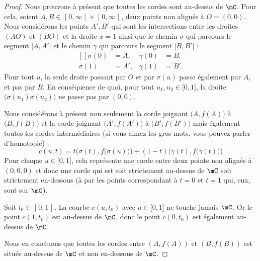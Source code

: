 \begin{proof}
	Nous prouvons à présent que toutes les cordes sont au-dessus de \( \mC\). Pour cela, soient \( A,B\in \mathopen] 0 , \infty \mathclose[\times \mathopen] 0 , \infty \mathclose[\), deux points non alignés à \( O=(0,0)\). Nous considérons les points \( A',B'\) qui sont les intersections entre les droites \( (AO)\) et \( (BO)\) et la droite \( x=1\) ainsi que le chemin \( \sigma\) qui parcours le segment \( \mathopen[ A , A' \mathclose]\) et le chemin \( \gamma\) qui parcours le segment \( \mathopen[ B , B' \mathclose]\) :
		\begin{equation}
			\begin{aligned}[]
				\sigma(0) & =A,  & \gamma(0) & =B,  \\
				\sigma(1) & =A', & \gamma(1) & =B'.
			\end{aligned}
		\end{equation}
		Pour tout \( u\), la seule droite passant par \( O\) et par \( \sigma(u)\) passe également par \( A\), et pas par \( B\). En conséquence de quoi, pour tout \( u_1,u_2\in \mathopen[ 0 , 1 \mathclose]\), la droite \( \big( \sigma(u_1)\sigma(u_2) \big)\) ne passe pas par \( (0,0)\).

		Nous considérons à présent non seulement la corde joignant \( \big( A,f(A) \big)\) à \( \big( B,f(B) \big)\) et la corde joignant \( \big( A',f(A') \big)\) à \( \big( B',f(B') \big)\) mais également toutes les cordes intermédiaires (si vous aimez les gros mots, vous pouvez parler d'homotopie) :
		\begin{equation}
			c(u,t)=t\Big( \sigma(t), f\big(\sigma(u)\big) \Big)+(1-t)\Big( \gamma(t),f\big( \gamma(t) \big) \Big)
		\end{equation}
		Pour chaque \( u\in\mathopen[ 0 , 1 \mathclose]\), cela représente une corde entre deux points non alignés à \( (0,0,0)\) et donc une corde qui est soit strictement au-dessus de \( \mC\) soit strictement en-dessous (à par les points correspondant à \( t=0\) et \( t=1\) qui, eux, sont sur \( \mC\)).

		Soit \( t_0\in \mathopen] 0 , 1 \mathclose[\). La courbe \( c(u,t_0)\) avec \( u\in\mathopen[ 0 , 1 \mathclose]\) ne touche jamais \( \mC\). Or le point \( c(1,t_0)\) est au-dessus de \( \mC\), donc le point \( c(0,t_0)\) est également au-dessus de \( \mC\).

	Nous en concluons que toutes les cordes entre \( (A,f(A)) \) et \( (B,f(B))\) est située au-dessus de \( \mC\) et non en-dessous de \( \mC\).
\end{proof}

